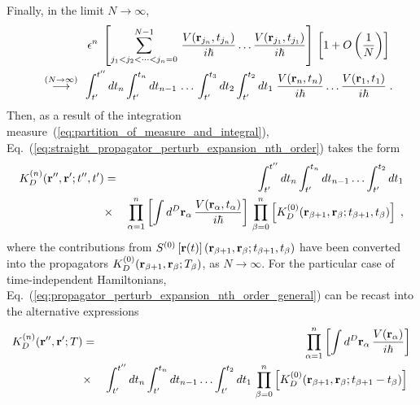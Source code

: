 \documentclass[a4paper,preprint,draft,showpacs,amsmath,amsfonts,amssymb,aps,prd]{revtex4}%
\begin{document}
Finally, in the limit $N \rightarrow \infty$,
\begin{eqnarray}
& &
\epsilon^{n}
\;
\left[
\sum^{N-1}_{ 
          j_{1} < j_{2} <  \dots  < j_{n} =0 }
\,
\frac{ V( {\bf r}_{j_{n}}, t_{j_{n}} ) }{i \hbar}
\ldots
\frac{ V( {\bf r}_{j_{1}}, t_{j_{1}} ) }{i \hbar}
\right]
\,
\left[ 1 + O \left( \frac{1}{N} \right) \right]
\;  
\nonumber \\
&  &
\stackrel{ \; (N \rightarrow \infty) \; }{\longrightarrow}
\,
\int_{t'}^{t''} 
dt_{n} 
\int_{t'}^{t_{n}} 
dt_{n-1} 
\,
\ldots
\,
\int_{t'}^{t_{3}} 
dt_{2} 
\int_{t'}^{t_{2}} 
dt_{1} 
\;
\frac{ V({\bf r}_{n}, t_{n})
                 }{i \hbar}
\ldots
\frac{ V({\bf r}_{1}, t_{1})
                } {i \hbar}
\;  .
\label{eq:perturbation_potential_expansion_T_ordering}
\end{eqnarray}
Then,
as a result of the integration measure~(\ref{eq:partition_of_measure_and_integral}),
Eq.~(\ref{eq:straight_propagator_perturb_expansion_nth_order}) takes the form
\begin{eqnarray}
K^{(n)}_{D}({\bf r}'', {\bf r}' ; t'',t')
& = &
\int_{t'}^{t''} dt_{n} 
\int_{t'}^{t_{n}} dt_{n-1} 
\ldots
\int_{t'}^{t_{2}} dt_{1} 
\nonumber 
\\
& \times &
\prod_{\alpha=1}^{n} \left[
 \int
d^{D} {\bf r}_{\alpha} \,
\frac{   V({\bf r}_{\alpha},t_{\alpha})  
                       }{i \hbar} 
\right]
\,
\prod_{\beta=0}^{n} 
\left[
K^{(0)}_{D}({\bf r}_{\beta + 1}, {\bf r}_{\beta} ; 
t_{\beta+1},t_{\beta} )  \right]
\;   ,
\label{eq:propagator_perturb_expansion_nth_order_general}
\end{eqnarray}
where the contributions from 
$
S^{(0)}   
 \left[ 
{\bf r} (t)
\right]  
\left( {\bf r}_{\beta+1}, {\bf r}_{\beta} ; t_{\beta+1},t_{\beta}  \right)  
$
have been converted into the propagators
$K^{(0)}_{D}({\bf r}_{\beta + 1}, {\bf r}_{\beta} ; T_{\beta} )  $,
as $N \rightarrow \infty$.
For the particular case of time-independent Hamiltonians, 
Eq.~(\ref{eq:propagator_perturb_expansion_nth_order_general})
can be recast into the
alternative expressions
\begin{eqnarray}
K^{(n)}_{D}({\bf r}'', {\bf r}' ; T)
& = &
\prod_{\alpha=1}^{n} \left[
 \int
d^{D} {\bf r}_{\alpha} \,
\frac{   V({\bf r}_{\alpha})  }{i \hbar} 
\right]
\nonumber 
\\
& \times &
\int_{t'}^{t''} dt_{n} 
\int_{t'}^{t_{n}} dt_{n-1} 
\ldots
\int_{t'}^{t_{2}} dt_{1} 
\,
\prod_{\beta=0}^{n} 
\left[
K^{(0)}_{D}({\bf r}_{\beta + 1}, {\bf r}_{\beta} ; 
t_{\beta+1}-t_{\beta} )  \right]
\;   
\label{eq:propagator_perturb_expansion_nth_order}
\end{eqnarray}
\end{document}
